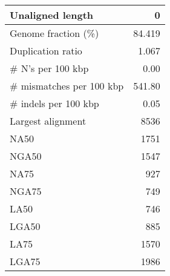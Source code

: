 \documentclass[12pt,a4paper]{article}
\begin{document}
\begin{table}[ht]
\begin{center}
\begin{tabular}{|l*{1}{|r}|}
Unaligned length & 0 \\ \hline
Genome fraction (\%) & 84.419 \\ \hline
Duplication ratio & 1.067 \\ \hline
\# N's per 100 kbp & 0.00 \\ \hline
\# mismatches per 100 kbp & 541.80 \\ \hline
\# indels per 100 kbp & 0.05 \\ \hline
Largest alignment & 8536 \\ \hline
NA50 & 1751 \\ \hline
NGA50 & 1547 \\ \hline
NA75 & 927 \\ \hline
NGA75 & 749 \\ \hline
LA50 & 746 \\ \hline
LGA50 & 885 \\ \hline
LA75 & 1570 \\ \hline
LGA75 & 1986 \\ \hline
\end{tabular}
\end{center}
\end{table}
\end{document}
